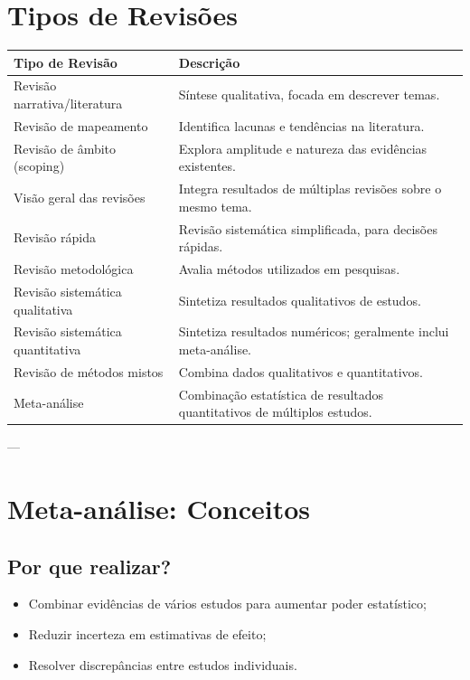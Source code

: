 \documentclass[12pt,a4paper]{article}
\begin{document}
\section{Tipos de Revisões}
\begin{longtable}{p{6cm} p{10cm}}
\toprule
\textbf{Tipo de Revisão} & \textbf{Descrição} \\
\midrule
Revisão narrativa/literatura & Síntese qualitativa, focada em descrever temas. \\
Revisão de mapeamento & Identifica lacunas e tendências na literatura. \\
Revisão de âmbito (scoping) & Explora amplitude e natureza das evidências existentes. \\
Visão geral das revisões & Integra resultados de múltiplas revisões sobre o mesmo tema. \\
Revisão rápida & Revisão sistemática simplificada, para decisões rápidas. \\
Revisão metodológica & Avalia métodos utilizados em pesquisas. \\
Revisão sistemática qualitativa & Sintetiza resultados qualitativos de estudos. \\
Revisão sistemática quantitativa & Sintetiza resultados numéricos; geralmente inclui meta-análise. \\
Revisão de métodos mistos & Combina dados qualitativos e quantitativos. \\
Meta-análise & Combinação estatística de resultados quantitativos de múltiplos estudos. \\
\bottomrule
\end{longtable}

---

\section{Meta-análise: Conceitos}
\subsection{Por que realizar?}
\begin{itemize}
    \item Combinar evidências de vários estudos para aumentar poder estatístico;
    \item Reduzir incerteza em estimativas de efeito;
    \item Resolver discrepâncias entre estudos individuais.
\end{itemize}
\end{document}
